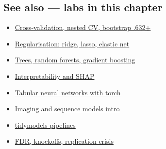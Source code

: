 \documentclass[
]{article}
\providecommand{\tightlist}{%
  \setlength{\itemsep}{0pt}\setlength{\parskip}{0pt}}
\begin{document}
\subsection{See also --- labs in this
chapter}\label{see-also-labs-in-this-chapter}

\begin{itemize}
\tightlist
\item
  \href{labs/lab-cross-validation-nested-cv-bootstrap-632.Rmd}{Cross-validation,
  nested CV, bootstrap .632+}
\item
  \href{labs/lab-regularisation-ridge-lasso-elastic-net.Rmd}{Regularisation:
  ridge, lasso, elastic net}
\item
  \href{labs/lab-trees-random-forests-gradient-boosting.Rmd}{Trees,
  random forests, gradient boosting}
\item
  \href{labs/lab-interpretability-and-shap.Rmd}{Interpretability and
  SHAP}
\item
  \href{labs/lab-tabular-neural-networks-with-torch.Rmd}{Tabular neural
  networks with torch}
\item
  \href{labs/lab-imaging-and-sequence-models-intro.Rmd}{Imaging and
  sequence models intro}
\item
  \href{labs/lab-tidymodels-pipelines.Rmd}{tidymodels pipelines}
\item
  \href{labs/lab-fdr-knockoffs-replication-crisis.Rmd}{FDR, knockoffs,
  replication crisis}
\end{itemize}
\end{document}

